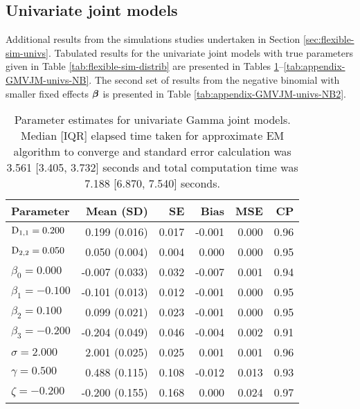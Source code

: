 \subsection{Univariate joint models}\label{sec:appendix-GMVJM-univs}
Additional results from the simulations studies undertaken in Section \ref{sec:flexible-sim-univs}. Tabulated results for the univariate joint models with true parameters given in Table \ref{tab:flexible-sim-distrib} are presented in Tables \ref{tab:appendix-GMVJM-univs-Gamma}--\ref{tab:appendix-GMVJM-univs-NB}. The second set of results from the negative binomial with smaller fixed effects $\bm{\beta}$ is presented in Table \ref{tab:appendix-GMVJM-univs-NB2}.
\begin{table}[ht]
\centering
{}
\captionsetup{font=scriptsize}
\begingroup\scriptsize
\begin{tabular}{l|rrrrr}
  Parameter & Mean (SD) & SE & Bias & MSE & CP \\ 
  \hline
  $\mathrm{D}_{1,1} = 0.200$ &  0.199 (0.016) & 0.017 & -0.001 & 0.000 & 0.96 \\ 
  $\mathrm{D}_{2,2} = 0.050$ &  0.050 (0.004) & 0.004 &  0.000 & 0.000 & 0.95 \\ 
  $\beta_{0} = 0.000$ & -0.007 (0.033) & 0.032 & -0.007 & 0.001 & 0.94 \\ 
  $\beta_{1} = -0.100$ & -0.101 (0.013) & 0.012 & -0.001 & 0.000 & 0.95 \\ 
  $\beta_{2} = 0.100$ &  0.099 (0.021) & 0.023 & -0.001 & 0.000 & 0.95 \\ 
  $\beta_{3} = -0.200$ & -0.204 (0.049) & 0.046 & -0.004 & 0.002 & 0.91 \\ 
  $\sigma = 2.000$ &  2.001 (0.025) & 0.025 &  0.001 & 0.001 & 0.96 \\ 
  $\gamma = 0.500$ &  0.488 (0.115) & 0.108 & -0.012 & 0.013 & 0.93 \\ 
  $\zeta = -0.200$ & -0.200 (0.155) & 0.168 &  0.000 & 0.024 & 0.97 \\ 
   \hline
\end{tabular}
\endgroup
\caption{Parameter estimates for univariate Gamma joint models. Median [IQR] elapsed time taken for approximate EM algorithm to converge and standard error calculation was 3.561 [3.405, 3.732] seconds and total computation time was 7.188 [6.870, 7.540] seconds.} 
\label{tab:appendix-GMVJM-univs-Gamma}
\end{table}

